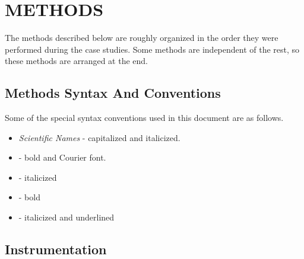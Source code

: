 
\chapter{METHODS}\label{ch:methods}

The methods described below are roughly organized in the order they were performed during the case studies. 
Some methods are independent of the rest, so these methods are arranged at the end.

\section{Methods Syntax And Conventions}

Some of the special syntax conventions used in this document are as follows.

\begin{itemize}
\item \textit{Scientific Names} - capitalized and italicized.
\item {} - bold and Courier font.
\item {} - italicized
\item {} - bold
\item {} - italicized and underlined
\end{itemize}

\clearpage %

\section{Instrumentation}

